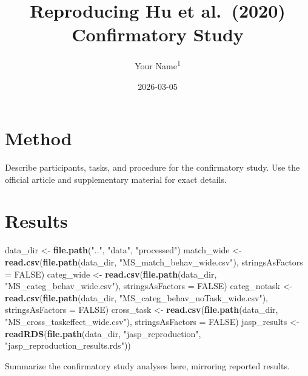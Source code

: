 \documentclass[
  english,
  jou]{apa6}
\title{Reproducing Hu et al.~(2020) Confirmatory Study}
\author{Your Name\textsuperscript{1}}
\date{2026-03-05}
\affiliation{\vspace{0.5cm}\textsuperscript{1} Your Institution}
\newenvironment{Shaded}{\begin{snugshade}}{\end{snugshade}}
\newcommand{\AttributeTok}[1]{\textcolor[rgb]{0.13,0.29,0.53}{#1}}
\newcommand{\ConstantTok}[1]{\textcolor[rgb]{0.56,0.35,0.01}{#1}}
\newcommand{\FunctionTok}[1]{\textcolor[rgb]{0.13,0.29,0.53}{\textbf{#1}}}
\newcommand{\NormalTok}[1]{#1}
\newcommand{\OtherTok}[1]{\textcolor[rgb]{0.56,0.35,0.01}{#1}}
\newcommand{\StringTok}[1]{\textcolor[rgb]{0.31,0.60,0.02}{#1}}
\begin{document}
\maketitle

\section{Method}\label{method}

Describe participants, tasks, and procedure for the confirmatory study. Use the official article and supplementary material for exact details.

\section{Results}\label{results}

\begin{Shaded}
\begin{Highlighting}[]
\NormalTok{data\_dir }\OtherTok{\textless{}{-}} \FunctionTok{file.path}\NormalTok{(}\StringTok{".."}\NormalTok{, }\StringTok{"data"}\NormalTok{, }\StringTok{"processed"}\NormalTok{)}
\NormalTok{match\_wide }\OtherTok{\textless{}{-}} \FunctionTok{read.csv}\NormalTok{(}\FunctionTok{file.path}\NormalTok{(data\_dir, }\StringTok{"MS\_match\_behav\_wide.csv"}\NormalTok{), }\AttributeTok{stringsAsFactors =} \ConstantTok{FALSE}\NormalTok{)}
\NormalTok{categ\_wide }\OtherTok{\textless{}{-}} \FunctionTok{read.csv}\NormalTok{(}\FunctionTok{file.path}\NormalTok{(data\_dir, }\StringTok{"MS\_categ\_behav\_wide.csv"}\NormalTok{), }\AttributeTok{stringsAsFactors =} \ConstantTok{FALSE}\NormalTok{)}
\NormalTok{categ\_notask }\OtherTok{\textless{}{-}} \FunctionTok{read.csv}\NormalTok{(}\FunctionTok{file.path}\NormalTok{(data\_dir, }\StringTok{"MS\_categ\_behav\_noTask\_wide.csv"}\NormalTok{), }\AttributeTok{stringsAsFactors =} \ConstantTok{FALSE}\NormalTok{)}
\NormalTok{cross\_task }\OtherTok{\textless{}{-}} \FunctionTok{read.csv}\NormalTok{(}\FunctionTok{file.path}\NormalTok{(data\_dir, }\StringTok{"MS\_cross\_taskeffect\_wide.csv"}\NormalTok{), }\AttributeTok{stringsAsFactors =} \ConstantTok{FALSE}\NormalTok{)}
\NormalTok{jasp\_results }\OtherTok{\textless{}{-}} \FunctionTok{readRDS}\NormalTok{(}\FunctionTok{file.path}\NormalTok{(data\_dir, }\StringTok{"jasp\_reproduction"}\NormalTok{, }\StringTok{"jasp\_reproduction\_results.rds"}\NormalTok{))}
\end{Highlighting}
\end{Shaded}

Summarize the confirmatory study analyses here, mirroring reported results.
\end{document}
